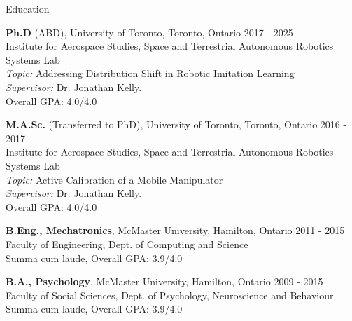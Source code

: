 \documentclass[usenames, dvipsnames]{resume} %
\begin{document}
	




% 
%


\begin{rSection}{Education}

\textbf{Ph.D} (ABD), University of Toronto, Toronto, Ontario \hfill {2017 - 2025} \\
Institute for Aerospace Studies, Space and Terrestrial Autonomous Robotics Systems Lab \smallskip \\
\textit{Topic:} Addressing Distribution Shift in Robotic Imitation Learning\\
\textit{Supervisor:} Dr. Jonathan Kelly. \smallskip \\
Overall GPA: 4.0/4.0

\textbf{M.A.Sc.} (Transferred to PhD), University of Toronto, Toronto, Ontario \hfill {2016 - 2017} \\
Institute for Aerospace Studies, Space and Terrestrial Autonomous Robotics Systems Lab \smallskip \\
\textit{Topic:} Active Calibration of a Mobile Manipulator \\
\textit{Supervisor:} Dr. Jonathan Kelly. \smallskip \\
Overall GPA: 4.0/4.0

\textbf{B.Eng., Mechatronics}, McMaster University, Hamilton, Ontario \hfill {2011 - 2015} \\
Faculty of Engineering, Dept. of Computing and Science \smallskip \\
Summa cum laude, Overall GPA: 3.9/4.0

\textbf{B.A., Psychology}, McMaster University, Hamilton, Ontario \hfill {2009 - 2015} \\
Faculty of Social Sciences, Dept. of Psychology, Neuroscience and Behaviour \smallskip \\
Summa cum laude, Overall GPA: 3.9/4.0

\end{rSection}
\end{document}
